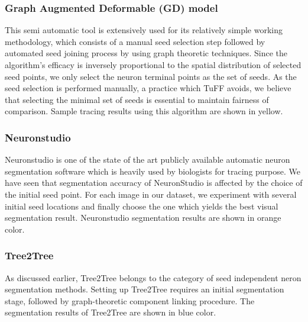 \subsubsection{Graph Augmented Deformable (GD) model \cite{peng_GAD}} 
This semi automatic tool is extensively used for its relatively simple working methodology, which consists of a manual seed selection step followed by automated seed joining process by using graph theoretic techniques. Since the algorithm's efficacy is inversely proportional to the spatial distribution of selected seed points, we only select the neuron terminal points as the set of seeds. As the seed selection is performed manually, a practice which TuFF avoids, we believe that selecting the minimal set of seeds is essential to maintain fairness of comparison. Sample tracing results using this algorithm are shown in yellow.

\subsubsection{Neuronstudio \cite{rodriguez_voxelscoop}}
Neuronstudio is one of the state of the art publicly available automatic neuron segmentation software which is heavily used by biologists for tracing purpose. We have seen that segmentation accuracy of NeuronStudio is affected by the choice of the initial seed point. For each image in our dataset, we experiment with several initial seed locations and finally choose the one which yields the best visual segmentation result. Neuronstudio segmentation results are shown in orange color.

\subsubsection{Tree2Tree \cite{basu_T2T_journal}}
As discussed earlier, Tree2Tree belongs to the category of seed independent neron segmentation methods. Setting up Tree2Tree requires an initial segmentation stage, followed by graph-theoretic component linking procedure. The segmentation results of Tree2Tree are shown in blue color.

